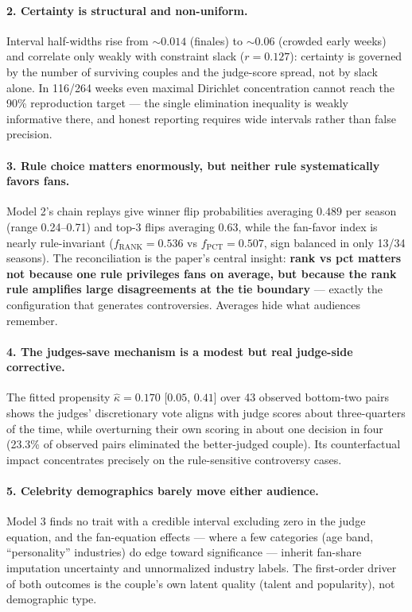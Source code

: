 \documentclass[11pt]{article}
\begin{document}
\paragraph{2. Certainty is structural and non-uniform.}
Interval half-widths rise from $\sim 0.014$ (finales) to $\sim 0.06$ (crowded early
weeks) and correlate only weakly with constraint slack ($r = 0.127$): certainty is
governed by the number of surviving couples and the judge-score spread, not by slack
alone. In 116/264 weeks even maximal Dirichlet concentration cannot reach the 90\%
reproduction target --- the single elimination inequality is weakly informative there,
and honest reporting requires wide intervals rather than false precision.

\paragraph{3. Rule choice matters enormously, but neither rule systematically favors
fans.}
Model 2's chain replays give winner flip probabilities averaging $0.489$ per season
(range 0.24--0.71) and top-3 flips averaging $0.63$, while the fan-favor index is
nearly rule-invariant ($f_{\text{RANK}} = 0.536$ vs $f_{\text{PCT}} = 0.507$, sign
balanced in only 13/34 seasons). The reconciliation is the paper's central insight:
\textbf{rank vs pct matters not because one rule privileges fans on average, but
because the rank rule amplifies large disagreements at the tie boundary} --- exactly
the configuration that generates controversies. Averages hide what audiences remember.

\paragraph{4. The judges-save mechanism is a modest but real judge-side corrective.}
The fitted propensity $\hat\kappa = 0.170$ [$0.05$, $0.41$] over 43 observed bottom-two
pairs shows the judges' discretionary vote aligns with judge scores about
three-quarters of the time, while overturning their own scoring in about one decision
in four (23.3\% of observed pairs eliminated the better-judged couple). Its
counterfactual impact concentrates precisely on the rule-sensitive controversy cases.

\paragraph{5. Celebrity demographics barely move either audience.}
Model 3 finds no trait with a credible interval excluding zero in the judge equation,
and the fan-equation effects --- where a few categories (age band, ``personality''
industries) do edge toward significance --- inherit fan-share imputation uncertainty
and unnormalized industry labels. The first-order driver of both outcomes is the
couple's own latent quality (talent and popularity), not demographic type.
\end{document}
